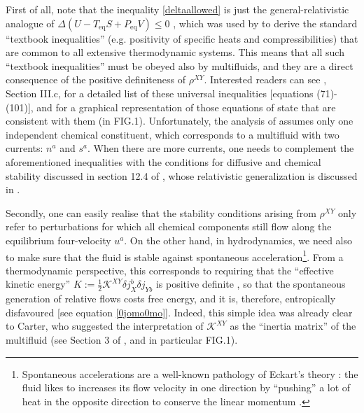 \documentclass[a4paper, amsfonts, amssymb, amsmath, reprint, showkeys, nofootinbib, twoside, onecolumn,notitlepage]{revtex4-1}
\theoremstyle{definition}
\theoremstyle{theorem}
\begin{document}
First of all, note that the inequality \eqref{deltaallowed} is just the general-relativistic analogue of $\Delta(U-T_\text{eq} S +P_\text{eq}V) \leq 0 $ \cite{Stuekelberg1962,Israel_2009_inbook}, which was used by \citet{landau5} to derive the standard ``textbook inequalities'' (e.g. positivity of specific heats and compressibilities) that are common to all extensive thermodynamic systems. This means that all such ``textbook inequalities''  must be obeyed also by multifluids, and they are a direct consequence of the positive definiteness of $\rho^{XY}$. Interested readers can see \citet{Hishcock1983}, Section III.c, for a detailed list of these universal inequalities [equations (71)-(101)], and for a graphical representation of those equations of state that are consistent with them (in FIG.1). Unfortunately, the analysis of \citet{Hishcock1983} assumes only one independent chemical constituent, which corresponds to a multifluid with two currents: $n^a$ and $s^a$. When there are more currents, one needs to complement the aforementioned inequalities with the conditions for diffusive and chemical stability discussed in section 12.4 of 
\citet{PrigoginebookModernThermodynamics2014}, whose relativistic generalization is discussed in \cite{GavassinoGibbs2021,CamelioGavassino2022}. 

Secondly, one can easily realise that the stability conditions arising from $\rho^{XY}$ only refer to perturbations for which all chemical components still flow along the equilibrium four-velocity $u^a$. On the other hand, in hydrodynamics, we need also to make sure that the fluid is stable against spontaneous acceleration\footnote{Spontaneous accelerations are a well-known pathology of Eckart's theory \cite{Eckart40}: the fluid likes to increases its flow velocity in one direction by ``pushing'' a lot of heat in the opposite direction to conserve the linear momentum \cite{GavassinoLyapunov_2020}.}. From a thermodynamic perspective, this corresponds to requiring that the ``effective kinetic energy''
$
K :=\frac{1}{2}\mathcal{K}^{XY} \delta j_X^b \delta j_{Yb}
$
is positive definite \cite{chamelhaensel2006}, so that the spontaneous generation of relative flows costs free energy, and it is, therefore, entropically disfavoured [see equation \eqref{0jomo0mo}]. Indeed, this simple idea was already clear to Carter, who suggested the interpretation of $\mathcal{K}^{XY}$ as the ``inertia matrix'' of the multifluid (see Section 3 of \citet{carter92}, and in particular FIG.1).
\end{document}
